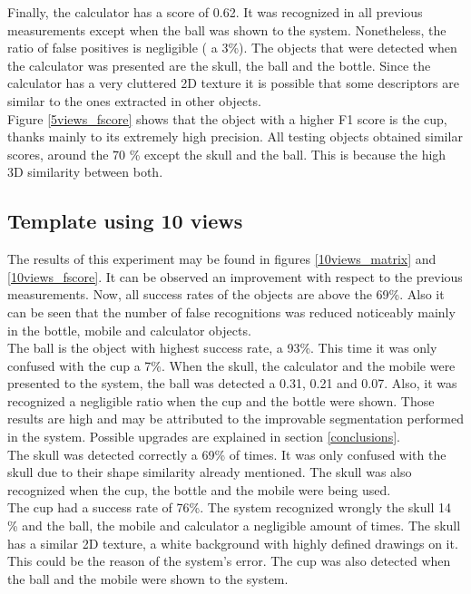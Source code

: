 	Finally, the calculator has a score of 0.62. 
	It was recognized in all previous measurements except when the ball was shown to the system. 
	Nonetheless, the ratio of false positives is negligible ( a 3\%). 
	The objects that were detected when the calculator was presented are the skull, the ball and the bottle. 
	Since the calculator has a very cluttered 2D texture it is possible that some descriptors are similar to the ones extracted in other objects. 
	\\

	Figure \ref{5views_fscore} shows that the object with a higher F1 score is the cup, thanks mainly to its extremely high precision.  
	All testing objects obtained similar scores, around the 70 \% except the skull and the ball. 
	This is because the high 3D similarity between both. 


	\subsection{Template using 10 views}
	The results of this experiment may be found in figures \ref{10views_matrix} and \ref{10views_fscore}. 
	It can be observed an improvement with respect to the previous measurements. 
	Now, all success rates of the objects are above the 69\%. 
	Also it can be seen that the number of false recognitions was reduced noticeably mainly in the bottle, mobile and calculator objects. 
	\\

	The ball is the object with highest success rate, a 93\%. 
	This time it was only confused with the cup a 7\%. 
	When the skull, the calculator and the mobile were presented to the system, the ball was detected a 0.31, 0.21 and 0.07. 
	Also, it was recognized a negligible ratio when the cup and the bottle were shown. 
	Those results are high and may be attributed to the improvable segmentation performed in the system. 
	Possible upgrades are explained in section \ref{conclusions}.
	\\
	
	The skull was detected correctly a 69\% of times. 
	It was only confused with the skull due to their shape similarity already mentioned.
	The skull was also recognized when the cup, the bottle and the mobile were being used. 
	\\
	The cup had a success rate of 76\%. 
	The system recognized wrongly the skull 14 \% and the ball, the mobile and calculator a negligible amount of times. 
	The skull has a similar 2D texture, a white background with highly defined drawings on it. 
	This could be the reason of the system's error. 
	The cup was also detected when the ball and the mobile were shown to the system. 
	\\

